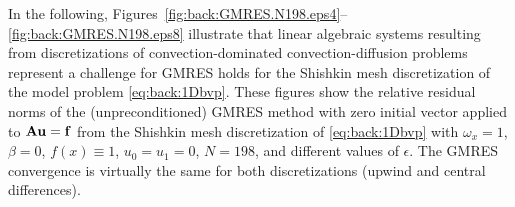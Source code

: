 In the following, Figures~\ref{fig:back:GMRES.N198.eps4}--\ref{fig:back:GMRES.N198.eps8}
illustrate that linear algebraic systems resulting from
discretizations of convection-dominated convection-diffusion problems represent
a challenge for GMRES holds for the Shishkin mesh
discretization of the model problem \eqref{eq:back:1Dbvp}. These figures show
the relative residual norms of the (unpreconditioned) GMRES method with zero
initial vector applied to $\mathbf{A}\mathbf{u}=\mathbf{f}$ from the Shishkin mesh discretization of
\eqref{eq:back:1Dbvp} with $\omega_x=1$, $\beta=0$, $f(x)\equiv 1$, $u_0=u_1=0$,
$N=198$, and different values of $\epsilon$. The GMRES convergence is virtually
the same for both discretizations (upwind and central differences).

%

